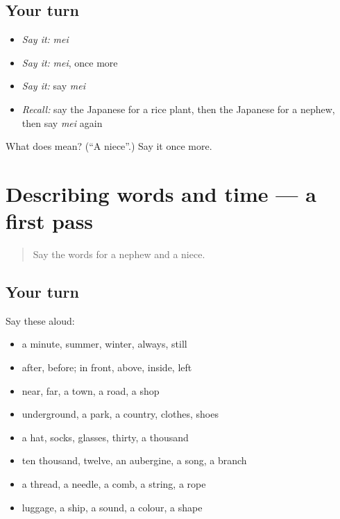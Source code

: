 \subsection*{Your turn}
\begin{itemize}
\raggedright
  \item \emph{Say it:} \emph{mei}
  \item \emph{Say it:} \emph{mei}, once more
  \item \emph{Say it:} say \emph{mei}
  \item \emph{Recall:} say the Japanese for a rice plant, then the Japanese for a nephew, then say \emph{mei} again
\end{itemize}

\begin{tcolorbox}[breakable,colback=teal!4,colframe=teal!35!black,title={Before you move on}]
What does  mean? (\textquotedblleft{}A niece\textquotedblright{}.) Say it once more.
\end{tcolorbox}
\section[(dialogue)]{Describing words and time — a first pass}

\label{lesson:JA-R71-first-pass-describing-words-and-time}



\begin{quote}
Say the words for a nephew and a niece.
\end{quote}

\subsection*{Your turn}
Say these aloud:

\begin{itemize}
\raggedright
  \item a minute, summer, winter, always, still
  \item after, before; in front, above, inside, left
  \item near, far, a town, a road, a shop
  \item underground, a park, a country, clothes, shoes
  \item a hat, socks, glasses, thirty, a thousand
  \item ten thousand, twelve, an aubergine, a song, a branch
  \item a thread, a needle, a comb, a string, a rope
  \item luggage, a ship, a sound, a colour, a shape
\end{itemize}

